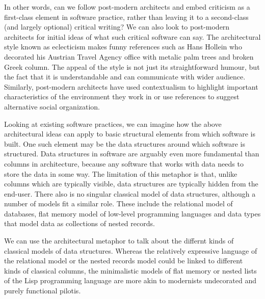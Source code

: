 In other words, can we follow post-modern architects and embed criticism as a first-class
element in software practice, rather than leaving it to a second-class (and largely optional)
critical writing? We can also look to
post-modern architects for initial ideas of what such critical software can say. The
architectural style known as eclecticism makes funny references such as Hans Hollein who
decorated his Austrian Travel Agency office with metalic palm trees and broken Greek
column. The appeal of the style is not just its straightforward humour,
but the fact that it is understandable and can communicate with wider audience. Similarly,
post-modern architects have used contextualism to highlight important characteristics of the
environment they work in or use references to suggest alternative social organization.

Looking at existing software practices, we can imagine how the above architectural ideas
can apply to basic structural elements from which software is built. One such element may
be the data structures around which software is structured. Data structures
in software are arguably even more fundamental than columns in architecture, because any
software that works with data needs to store the data in some way. The limitation of this
metaphor is that, unlike columns which are typically visible, data structures are typically
hidden from the end-user. There also is no singular classical model of data structures,
although a number of models fit a similar role. These include the relational model of databases,
flat memory model of low-level programming languages and data types that model data as collections
of nested records.

We can use the architectural metaphor to talk about the differnt kinds of classical models
of data structures. Whereas the relatively expressive language of the relational model or
the nested records model could be linked to different kinds of classical columns, the minimalistic
models of flat memory or nested lists of the Lisp programming language are more akin to
modernists undecorated and purely functional pilotis.

